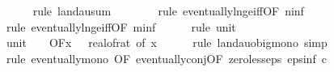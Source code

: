 \begin{isabellebody}
\ \ \ \ \isamarkupfalse%
\ {\isacharparenleft}{\kern0pt}rule\ landau{\isacharunderscore}{\kern0pt}sum{\isacharunderscore}{\kern0pt}{}{\isacharparenright}{\kern0pt}\isanewline
\ \ \ \ \ \ \isamarkupfalse%
\ {\isacharparenleft}{\kern0pt}rule\ eventually{\isacharunderscore}{\kern0pt}ln{\isacharunderscore}{\kern0pt}ge{\isacharunderscore}{\kern0pt}iff{\isacharbrackleft}{\kern0pt}OF\ n{\isacharunderscore}{\kern0pt}inf{\isacharbrackright}{\kern0pt}{\isacharparenright}{\kern0pt}\isanewline
\ \ \ \ \ \isamarkupfalse%
\ {\isacharparenleft}{\kern0pt}rule\ eventually{\isacharunderscore}{\kern0pt}ln{\isacharunderscore}{\kern0pt}ge{\isacharunderscore}{\kern0pt}iff{\isacharbrackleft}{\kern0pt}OF\ m{\isacharunderscore}{\kern0pt}inf{\isacharbrackright}{\kern0pt}{\isacharparenright}{\kern0pt}\isanewline
\ \ \ \ \isamarkupfalse%
\ {\isacharparenleft}{\kern0pt}rule\ unit{\isacharunderscore}{\kern0pt}{}{\isacharparenright}{\kern0pt}\isanewline
\isanewline
\ \ \isamarkupfalse%
\ unit{\isacharunderscore}{\kern0pt}{}{\isacharcolon}{\kern0pt}\ {\isachardoublequoteopen}{\isacharparenleft}{\kern0pt}{\isasymlambda}{\isacharunderscore}{\kern0pt}{\isachardot}{\kern0pt}\ {}{\isacharparenright}{\kern0pt}\ {\isasymin}\ O{\isacharbrackleft}{\kern0pt}{\isacharquery}{\kern0pt}F{\isacharbrackright}{\kern0pt}{\isacharparenleft}{\kern0pt}{\isasymlambda}x{\isachardot}{\kern0pt}\ {}\ {\isacharslash}{\kern0pt}\ real{\isacharunderscore}{\kern0pt}of{\isacharunderscore}{\kern0pt}rat\ {\isacharparenleft}{\kern0pt}{\isasymepsilon}{\isacharunderscore}{\kern0pt}of\ x{\isacharparenright}{\kern0pt}{\isacharparenright}{\kern0pt}{\isachardoublequoteclose}\isanewline
\ \ \ \ \isamarkupfalse%
\ {\isacharparenleft}{\kern0pt}rule\ landau{\isacharunderscore}{\kern0pt}o{\isachardot}{\kern0pt}big{\isacharunderscore}{\kern0pt}mono{\isacharcomma}{\kern0pt}\ simp{\isacharparenright}{\kern0pt}\isanewline
\ \ \ \ \isamarkupfalse%
\ {\isacharparenleft}{\kern0pt}rule\ eventually{\isacharunderscore}{\kern0pt}mono\ {\isacharbrackleft}{\kern0pt}OF\ eventually{\isacharunderscore}{\kern0pt}conj{\isacharbrackleft}{\kern0pt}OF\ zero{\isacharunderscore}{\kern0pt}less{\isacharunderscore}{\kern0pt}eps\ eps{\isacharunderscore}{\kern0pt}inf{\isacharbrackleft}{\kern0pt}\ c{\isacharequal}{\kern0pt}{\isachardoublequoteopen}{}{\isachardoublequoteclose}{\isacharbrackright}{\kern0pt}{\isacharbrackright}{\kern0pt}{\isacharbrackright}{\kern0pt}{\isacharparenright}{\kern0pt}\isanewline

\end{isabellebody}
